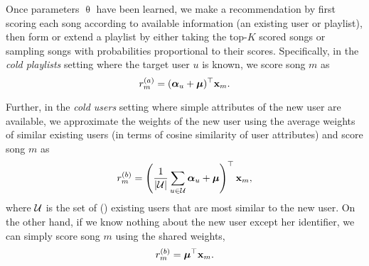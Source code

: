 Once parameters $\uptheta$ have been learned, 
we make a recommendation by first scoring each song according to available information (\eg an existing user or playlist),
then form or extend a playlist by either taking the top-$K$ scored songs or sampling songs with probabilities proportional to their scores.
%
Specifically, %
in the \emph{cold playlists} setting where the target user $u$ is known,
we score song $m$ as 
\begin{equation}
\label{eq:cp}
r_m^{(a)} = ({\bm{\alpha}}_u + \bm{\mu})^\top \mathbf{x}_m.
\end{equation}

Further, in the \emph{cold users} setting where %
simple attributes of the new user are available,
we approximate the weights of the new user using the average weights of similar existing users
(\eg in terms of cosine similarity of user attributes)
and score song $m$ as
\vspace{-.8em}
\begin{equation}
\label{eq:cu}
r_m^{(b)} = \left( \frac{1}{|\mathcal{U}|} \sum_{u \in \mathcal{U}} {\bm{\alpha}}_u + \bm{\mu} \right)^\top \mathbf{x}_m,
\end{equation}
where $\mathcal{U}$ is the set of () existing users that are most similar to the new user.
On the other hand, if we know nothing about the new user except her identifier,
we can simply score song $m$ using the shared weights, \ie
\begin{equation}
\label{eq:cu2}
r_m^{(b)} = \bm{\mu}^\top \mathbf{x}_m.
\end{equation}


